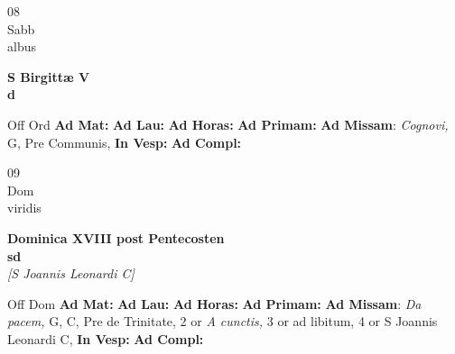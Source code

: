 \documentclass[10pt, openany]{book}
\begin{document}
    \begin{center}
        \begin{minipage}{3.5in}
            \vspace{2em}
            \begin{minipage}{0.5in}
                {\Huge 08} \\
                {\normalsize Sabb} \\
                {\normalsize albus}
            \end{minipage}
            \begin{minipage}{3.0in}
                \textbf{ \large S Birgittæ V \\
                \textnormal{\normalsize d}} \\ 
            \end{minipage}
            \begin{justify}Off Ord
                \textbf{Ad Mat: }
                \textbf{Ad Lau: }
                \textbf{Ad Horas: }
                \textbf{Ad Primam: }\textbf{Ad Missam}: \textit{Cognovi,} G, Pre Communis,  
                \textbf{In Vesp: }
                \textbf{Ad Compl: }
            \end{justify}
        \end{minipage}
    \end{center}

    \begin{center}
        \begin{minipage}{3.5in}
            \vspace{2em}
            \begin{minipage}{0.5in}
                {\Huge 09} \\
                {\normalsize Dom} \\
                {\normalsize viridis}
            \end{minipage}
            \begin{minipage}{3.0in}
                \textbf{ \large Dominica XVIII post Pentecosten \\
                \textnormal{\normalsize sd}} \\ \textit{[S Joannis Leonardi C]} \\ 
            \end{minipage}
            \begin{justify}Off Dom
                \textbf{Ad Mat: }
                \textbf{Ad Lau: }
                \textbf{Ad Horas: }
                \textbf{Ad Primam: }\textbf{Ad Missam}: \textit{Da pacem,} G, C, Pre de Trinitate, 2 or \textit{A cunctis,} 3 or ad libitum, 4 or S Joannis Leonardi C,  
                \textbf{In Vesp: }
                \textbf{Ad Compl: }
            \end{justify}
        \end{minipage}
    \end{center}
\end{document}
